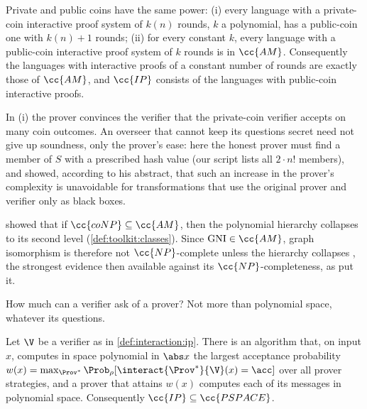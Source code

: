 \begin{refsection}
\begin{theorem}\label{thm:interaction:gsbm}
Private and public coins have the same power: (i) every language with a private-coin interactive proof system of $k(n)$ rounds, $k$ a polynomial, has a public-coin one with $k(n)+1$ rounds; (ii) for every constant $k$, every language with a public-coin interactive proof system of $k$ rounds is in $\cc{AM}$. Consequently the languages with interactive proofs of a constant number of rounds are exactly those of $\cc{AM}$, and $\cc{IP}$ consists of the languages with public-coin interactive proofs.
\end{theorem}

In (i) the prover convinces the verifier that the private-coin verifier accepts on many coin outcomes. An overseer that cannot keep its questions secret need not give up soundness, only the prover's ease: here the honest prover must find a member of $S$ with a prescribed hash value (our script lists all $2\cdot n!$ members), and \textcite{Vadhan2000} showed, according to his abstract, that such an increase in the prover's complexity is unavoidable for transformations that use the original prover and verifier only as black boxes.

\Textcite{BoppanaHastadZachos1987} showed that if $\cc{coNP}\subseteq\cc{AM}$, then the polynomial hierarchy collapses to its second level (\cref{def:toolkit:classes}). Since $\interactiongni\in\cc{AM}$, graph isomorphism is therefore not $\cc{NP}$-complete unless the hierarchy collapses \parencite[Corollary~2]{GoldreichMicaliWigderson1991}, the strongest evidence then available against its $\cc{NP}$-completeness, as \textcite{BabaiMoran1988} put it.

How much can a verifier ask of a prover? Not more than polynomial space, whatever its questions.

\begin{theorem}\label{thm:interaction:ipinpspace}
Let $\V$ be a verifier as in \cref{def:interaction:ip}. There is an algorithm that, on input $x$, computes in space polynomial in $\abs x$ the largest acceptance probability $w(x)=\max_{\Prov^*}\Prob_\rho[\interact{\Prov^*}{\V}(x)=\acc]$ over all prover strategies, and a prover that attains $w(x)$ computes each of its messages in polynomial space. Consequently $\cc{IP}\subseteq\cc{PSPACE}$.
\end{theorem}


\end{refsection}
